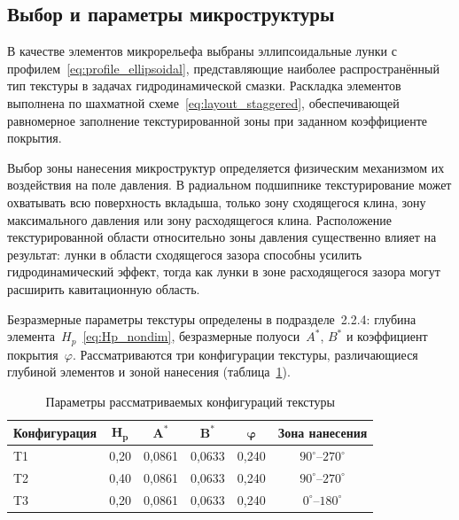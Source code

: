 \subsection{Выбор и параметры микроструктуры}

В качестве элементов микрорельефа выбраны эллипсоидальные лунки
с профилем~\eqref{eq:profile_ellipsoidal}, представляющие
наиболее распространённый тип текстуры в задачах
гидродинамической смазки. Раскладка элементов выполнена
по шахматной схеме~\eqref{eq:layout_staggered}, обеспечивающей
равномерное заполнение текстурированной зоны при заданном
коэффициенте покрытия.

Выбор зоны нанесения микроструктур определяется физическим
механизмом их воздействия на поле давления. В радиальном
подшипнике текстурирование может охватывать всю поверхность
вкладыша, только зону сходящегося клина, зону максимального
давления или зону расходящегося клина. Расположение текстурированной
области относительно зоны давления существенно влияет на результат:
лунки в области сходящегося зазора способны усилить
гидродинамический эффект, тогда как лунки в зоне расходящегося
зазора могут расширить кавитационную область.

Безразмерные параметры текстуры определены в подразделе~2.2.4:
глубина элемента~$H_p$~\eqref{eq:Hp_nondim}, безразмерные
полуоси~$A^*$, $B^*$ и коэффициент покрытия~$\varphi$.
Рассматриваются три конфигурации текстуры, различающиеся
глубиной элементов и зоной нанесения
(таблица~\ref{tab:texture_configs}).

\begin{table}[!ht]
\centering
\caption{Параметры рассматриваемых конфигураций текстуры}
\label{tab:texture_configs}
\begin{tabularx}{\textwidth}{|X|c|c|c|c|c|}
\hline
\multicolumn{1}{|c|}{\textbf{Конфигурация}}   & $\boldsymbol{H_p}$ & $\boldsymbol{A^*}$ & $\boldsymbol{B^*}$   & $\boldsymbol{\varphi}$ & \textbf{Зона нанесения} \\
\hline
T1 & 0{,}20 & 0{,}0861 & 0{,}0633 & 0{,}240 & $90^{\circ}$--$270^{\circ}$ \\
\hline
T2 & 0{,}40 & 0{,}0861 & 0{,}0633 & 0{,}240 & $90^{\circ}$--$270^{\circ}$ \\
\hline
T3 & 0{,}20 & 0{,}0861 & 0{,}0633 & 0{,}240 & $0^{\circ}$--$180^{\circ}$ \\
\hline
\end{tabularx}
\end{table}

\FloatBarrier

